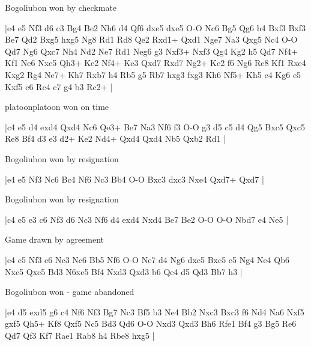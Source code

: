 \showboard

Bogoliubon won by checkmate

\makegametitle
|e4 e5 Nf3 d6 c3 Bg4 Be2 Nh6 d4 Qf6 dxe5 dxe5 O-O Nc6 Bg5 Qg6 h4 Bxf3 Bxf3 Be7 Qd2 Bxg5 hxg5 Ng8 Rd1 Rd8 Qe2 Rxd1+ Qxd1 Nge7 Na3 Qxg5 Nc4 O-O Qd7 Ng6 Qxc7 Nh4 Nd2 Ne7 Rd1 Neg6 g3 Nxf3+ Nxf3 Qg4 Kg2 h5 Qd7 Nf4+ Kf1 Ne6 Nxe5 Qh3+ Ke2 Nf4+ Ke3 Qxd7 Rxd7 Ng2+ Ke2 f6 Ng6 Re8 Kf1 Rxe4 Kxg2 Rg4 Ne7+ Kh7 Rxb7 h4 Rb5 g5 Rb7 hxg3 fxg3 Kh6 Nf5+ Kh5 c4 Kg6 c5 Kxf5 c6 Rc4 c7 g4 b3 Rc2+  |

\showboard

platoonplatoon won on time

\makegametitle
|c4 e5 d4 exd4 Qxd4 Nc6 Qe3+ Be7 Na3 Nf6 f3 O-O g3 d5 c5 d4 Qg5 Bxc5 Qxc5 Re8 Bf4 d3 e3 d2+ Ke2 Nd4+ Qxd4 Qxd4 Nb5 Qxb2 Rd1  |

\showboard

Bogoliubon won by resignation

\makegametitle
|e4 e5 Nf3 Nc6 Bc4 Nf6 Nc3 Bb4 O-O Bxc3 dxc3 Nxe4 Qxd7+ Qxd7  |

\showboard

Bogoliubon won by resignation

\makegametitle
|c4 e5 e3 c6 Nf3 d6 Nc3 Nf6 d4 exd4 Nxd4 Be7 Be2 O-O O-O Nbd7 e4 Ne5  |

\showboard

Game drawn by agreement

\makegametitle
|e4 c5 Nf3 e6 Nc3 Nc6 Bb5 Nf6 O-O Ne7 d4 Ng6 dxc5 Bxc5 e5 Ng4 Ne4 Qb6 Nxc5 Qxc5 Bd3 N6xe5 Bf4 Nxd3 Qxd3 b6 Qe4 d5 Qd3 Bb7 h3  |

\showboard

Bogoliubon won - game abandoned

\makegametitle
|e4 d5 exd5 g6 c4 Nf6 Nf3 Bg7 Nc3 Bf5 b3 Ne4 Bb2 Nxc3 Bxc3 f6 Nd4 Na6 Nxf5 gxf5 Qh5+ Kf8 Qxf5 Nc5 Bd3 Qd6 O-O Nxd3 Qxd3 Bh6 Rfe1 Bf4 g3 Bg5 Re6 Qd7 Qf3 Kf7 Rae1 Rab8 h4 Rbe8 hxg5  |

\showboard

